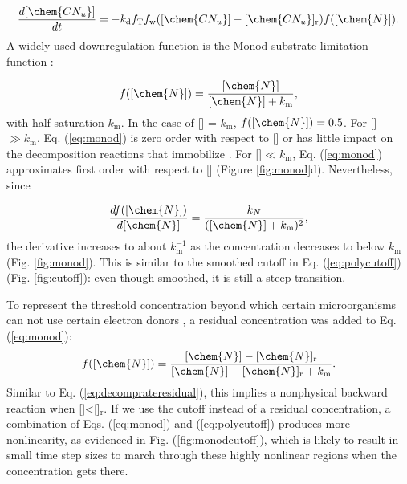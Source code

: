 \documentclass[gmd, manuscript]{copernicus}
\begin{document}
\begin{equation}
\frac{d [\chem{CN_u}]}{d t} = -k_\text{d} f_\text{T} f_\text{w} ([\chem{CN_u}] -
[\chem{CN_u}]_\text{r}) f([\chem{N}]).
\label{eq:decompresidualnlimit}
\end{equation}
A widely used downregulation function is the Monod substrate limitation
function \citep{Hammond2003,Tang2013a}:

\begin{equation}
f([\chem{N}])=\frac{[\chem{N}]}{[\chem{N}]+k_\text{m}},
\label{eq:monod}
\end{equation}
with half saturation $k_\text{m}$. In the case of [] = $k_\text{m}$,
$f([\chem{N}])=0.5$. For [] $\gg k_\text{m}$, Eq. (\ref{eq:monod}) is zero order with
respect to [] or has little impact on the decomposition reactions that
immobilize . For []$\ll k_\text{m}$, Eq. (\ref{eq:monod})
approximates first order with respect to [] (Figure \ref{fig:monod}d).
Nevertheless, since

\begin{equation}
\frac{df([\chem{N}])}{d [\chem{N}]}=\frac{k_N}{([\chem{N}]+k_\text{m})^2},
\label{eq:monodderiv}
\end{equation}
the derivative increases to about $k_\text{m}^{-1}$ as the concentration
decreases to below $k_\text{m}$ (Fig. \ref{fig:monod}). This is similar to the
smoothed cutoff in Eq. (\ref{eq:polycutoff}) (Fig. \ref{fig:cutoff}): even
though smoothed, it is still a steep transition.

To represent the threshold concentration beyond which certain microorganisms
can not use certain electron donors \citep{Fennell1998}, a residual
concentration was added to Eq. (\ref{eq:monod}): 
\begin{equation}
f([\chem{N}])=\frac{[\chem{N}]-[\chem{N}]_\text{r}}{[\chem{N}] -
[\chem{N}]_\text{r}+k_\text{m}}.
\label{eq:monodresidual}
\end{equation}
Similar to Eq. (\ref{eq:decomprateresidual}), this implies a nonphysical
backward reaction when []<[]$_\text{r}$. If we use the cutoff
instead of a residual concentration, a combination of Eqs. (\ref{eq:monod}) and
(\ref{eq:polycutoff}) produces more nonlinearity, as evidenced in Fig.
(\ref{fig:monodcutoff}), which is likely to result in small time step sizes to
march through these highly nonlinear regions when the concentration gets there.
\end{document}
